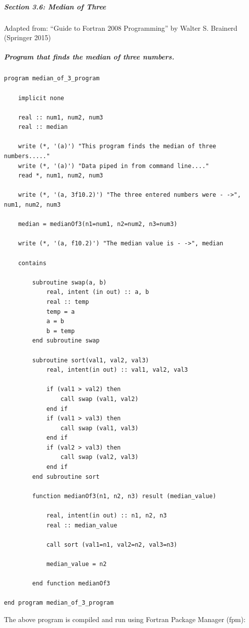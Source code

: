 \subparagraph{Section 3.6: Median of Three}

Adapted from: ``Guide to Fortran 2008 Programming'' by Walter S. Brainerd (Springer 2015)

\subparagraph{Program that finds the median of three numbers.}

\begin{verbatim}
program median_of_3_program

    implicit none

    real :: num1, num2, num3
    real :: median
    
    write (*, '(a)') "This program finds the median of three numbers....."
    write (*, '(a)') "Data piped in from command line...."
    read *, num1, num2, num3
    
    write (*, '(a, 3f10.2)') "The three entered numbers were - ->", num1, num2, num3
    
    median = medianOf3(n1=num1, n2=num2, n3=num3)
    
    write (*, '(a, f10.2)') "The median value is - ->", median
 
    contains

        subroutine swap(a, b)
            real, intent (in out) :: a, b
            real :: temp
            temp = a
            a = b
            b = temp
        end subroutine swap
    
        subroutine sort(val1, val2, val3)
            real, intent(in out) :: val1, val2, val3
        
            if (val1 > val2) then
                call swap (val1, val2)
            end if
            if (val1 > val3) then
                call swap (val1, val3)
            end if
            if (val2 > val3) then
                call swap (val2, val3)
            end if
        end subroutine sort

        function medianOf3(n1, n2, n3) result (median_value)
 
            real, intent(in out) :: n1, n2, n3
            real :: median_value
        
            call sort (val1=n1, val2=n2, val3=n3)
            
            median_value = n2
     
        end function medianOf3

end program median_of_3_program
\end{verbatim}

The above program is compiled and run using Fortran Package Manager (fpm):

